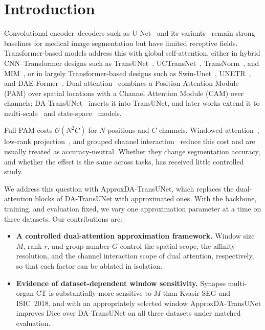 \section{Introduction}
\label{sec:intro}

Convolutional encoder--decoders such as U-Net~\cite{ronneberger2015unet} and its variants~\cite{zhou2018unetpp,oktay2018attention,diakogiannis2020resunet,ibtehaz2020multiresunet} remain strong baselines for medical image segmentation but have limited receptive fields. Transformer-based models address this with global self-attention, either in hybrid CNN--Transformer designs such as TransUNet~\cite{chen2021transunet}, UCTransNet~\cite{wang2022uctransnet}, TransNorm~\cite{azad2022transnorm}, and MIM~\cite{wang2022mim}, or in largely Transformer-based designs such as Swin-Unet~\cite{cao2022swinunet}, UNETR~\cite{hatamizadeh2022unetr}, and DAE-Former~\cite{azad2023daeformer}. Dual attention~\cite{fu2019dual} combines a Position Attention Module (PAM) over spatial locations with a Channel Attention Module (CAM) over channels; DA-TransUNet~\cite{sun2024datransunet} inserts it into TransUNet, and later works extend it to multi-scale~\cite{li2025dbaanet} and state-space~\cite{ding2025damamba} models.

Full PAM costs $\mathcal{O}(N^2C)$ for $N$ positions and $C$ channels. Windowed attention~\cite{liu2021swin}, low-rank projection~\cite{wang2020linformer}, and grouped channel interaction~\cite{rahman2024emcad} reduce this cost and are usually treated as accuracy-neutral. Whether they change segmentation accuracy, and whether the effect is the same across tasks, has received little controlled study.

We address this question with ApproxDA-TransUNet, which replaces the dual-attention blocks of DA-TransUNet with approximated ones. With the backbone, training, and evaluation fixed, we vary one approximation parameter at a time on three datasets. Our contributions are:
\begin{itemize}
  \item \textbf{A controlled dual-attention approximation framework.} Window size $M$, rank $r$, and group number $G$ control the spatial scope, the affinity resolution, and the channel interaction scope of dual attention, respectively, so that each factor can be ablated in isolation.
  \item \textbf{Evidence of dataset-dependent window sensitivity.} Synapse multi-organ CT is substantially more sensitive to $M$ than Kvasir-SEG and ISIC~2018, and with an appropriately selected window ApproxDA-TransUNet improves Dice over DA-TransUNet on all three datasets under matched evaluation.
\end{itemize}
